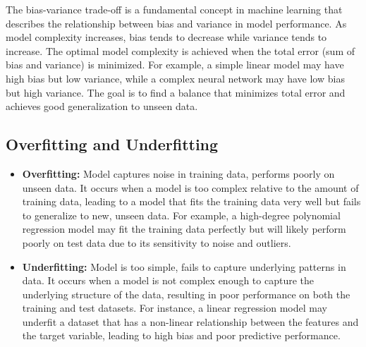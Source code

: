 \documentclass[
  letterpaper,
  DIV=11,
  numbers=noendperiod]{scrreprt}
\begin{document}
\begin{tcolorbox}[enhanced jigsaw, leftrule=.75mm, rightrule=.15mm, colback=white, colbacktitle=quarto-callout-note-color!10!white, arc=.35mm, opacityback=0, toptitle=1mm, bottomrule=.15mm, bottomtitle=1mm, titlerule=0mm, title=\textcolor{quarto-callout-note-color}{\faInfo}\hspace{0.5em}{Bias-Variance Trade-off}, toprule=.15mm, left=2mm, coltitle=black, breakable, colframe=quarto-callout-note-color-frame, opacitybacktitle=0.6]

The bias-variance trade-off is a fundamental concept in machine learning
that describes the relationship between bias and variance in model
performance. As model complexity increases, bias tends to decrease while
variance tends to increase. The optimal model complexity is achieved
when the total error (sum of bias and variance) is minimized. For
example, a simple linear model may have high bias but low variance,
while a complex neural network may have low bias but high variance. The
goal is to find a balance that minimizes total error and achieves good
generalization to unseen data.

\end{tcolorbox}

\subsection{Overfitting and
Underfitting}\label{overfitting-and-underfitting}

\begin{itemize}
\item
  \textbf{Overfitting:} Model captures noise in training data, performs
  poorly on unseen data. It occurs when a model is too complex relative
  to the amount of training data, leading to a model that fits the
  training data very well but fails to generalize to new, unseen data.
  For example, a high-degree polynomial regression model may fit the
  training data perfectly but will likely perform poorly on test data
  due to its sensitivity to noise and outliers.
\item
  \textbf{Underfitting:} Model is too simple, fails to capture
  underlying patterns in data. It occurs when a model is not complex
  enough to capture the underlying structure of the data, resulting in
  poor performance on both the training and test datasets. For instance,
  a linear regression model may underfit a dataset that has a non-linear
  relationship between the features and the target variable, leading to
  high bias and poor predictive performance.
\end{itemize}
\end{document}
